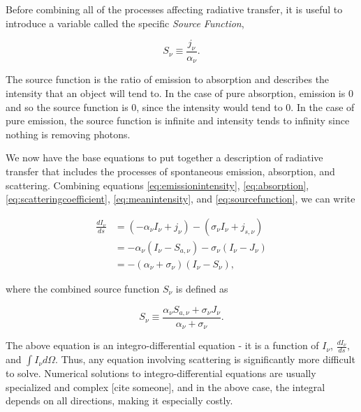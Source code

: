 Before combining all of the processes affecting radiative transfer, it is useful to introduce a variable called the specific \emph{Source Function},


\begin{equation}
\label{eq:sourcefunction}
S_{\nu} \equiv \frac{j_{\nu}}{\alpha_{\nu}}.
\end{equation}

The source function is the ratio of emission to absorption and describes the intensity that an object will tend to. In the case of pure absorption, emission is 0 and so the source function is 0, since the intensity would tend to 0. In the case of pure emission, the source function is infinite and intensity tends to infinity since nothing is removing photons.

We now have the base equations to put together a description of radiative transfer that includes the processes of spontaneous emission, absorption, and scattering. Combining equations \ref{eq:emissionintensity}, \ref{eq:absorption}, \ref{eq:scatteringcoefficient}, \ref{eq:meanintensity}, and \ref{eq:sourcefunction}, we can write

\begin{align}
\label{eq:combinedtransfer}
\frac{dI_{\nu}}{ds} &= (-\alpha_{\nu}I_{\nu} + j_{\nu}) - (\sigma_{\nu}I_{\nu} + j_{s,\nu}) \nonumber\\
 &= -\alpha_{\nu}(I_{\nu} - S_{a,\nu}) - \sigma_{\nu}(I_{\nu} - J_{\nu}) \nonumber\\
 &= -(\alpha_{\nu} + \sigma_{\nu})(I_{\nu}-S_{\nu}),
\end{align}

\noindent
where the combined source function $S_{\nu}$ is defined as

\begin{equation}
\label{eq:combinedsourcefunction}
S_{\nu} \equiv \frac{\alpha_{\nu}S_{a,\nu} + \sigma_{\nu}J_{\nu}}{\alpha_{\nu} + \sigma_{\nu}}.
\end{equation}

The above equation is an integro-differential equation - it is a function of $I_{\nu}$, $\frac{dI_{\nu}}{ds}$, and $\int I_{\nu} d\Omega$. Thus, any equation involving scattering is significantly more difficult to solve. Numerical solutions to integro-differential equations are usually specialized and complex [cite someone], and in the above case, the integral depends on all directions, making it especially costly.

